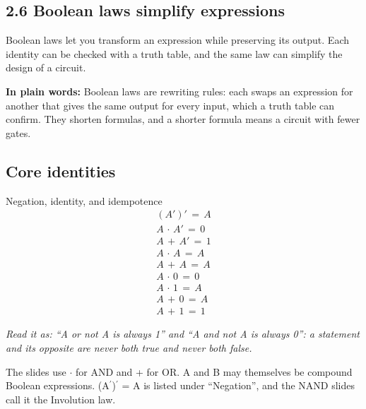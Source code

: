\documentclass[11pt]{article}
\begin{document}
\begin{keepsection}
\section{2.6 Boolean laws simplify expressions}

Boolean laws let you transform an expression while preserving its output. Each identity can be checked with a truth table, and the same law can simplify the design of a circuit.

\begin{plainbox}\textbf{In plain words:} Boolean laws are rewriting rules: each swaps an expression for another that gives the same output for every input, which a truth table can confirm. They shorten formulas, and a shorter formula means a circuit with fewer gates.\end{plainbox}

\begin{keepsection}
\subsection{Core identities}

\begin{equationcard}{Negation, identity, and idempotence}
\[ \begin{gathered} ({A}')'\, =\, {A} \\ {A}\, \cdot \, {A}'\, =\, 0 \\ {A}\, +\, {A}'\, =\, 1 \\ {A}\, \cdot \, {A}\, =\, {A} \\ {A}\, +\, {A}\, =\, {A} \\ {A}\, \cdot \, 0\, =\, 0 \\ {A}\, \cdot \, 1\, =\, {A} \\ {A}\, +\, 0\, =\, {A} \\ {A}\, +\, 1\, =\, 1 \end{gathered} \]
{\small \emph{Read it as: “A or not A is always 1” and “A and not A is always 0”: a statement and its opposite are never both true and never both false.}\par The slides use \ensuremath{\cdot} for AND and + for OR. A and B may themselves be compound Boolean expressions. (A\ensuremath{{}^{\prime}})\ensuremath{{}^{\prime}} = A is listed under “Negation”, and the NAND slides call it the Involution law.}
\end{equationcard}


\end{keepsection}
\end{keepsection}
\end{document}

